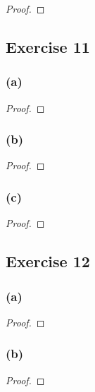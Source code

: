 \documentclass[14pt]{extarticle}
\begin{document}
\begin{proof}

\end{proof}

\subsection{Exercise 11}
\subsubsection{(a)}

\begin{proof}

\end{proof}

\subsubsection{(b)}

\begin{proof}

\end{proof}

\subsubsection{(c)}

\begin{proof}

\end{proof}

\subsection{Exercise 12}

\subsubsection{(a)}

\begin{proof}

\end{proof}

\subsubsection{(b)}

\begin{proof}

\end{proof}
\end{document}
